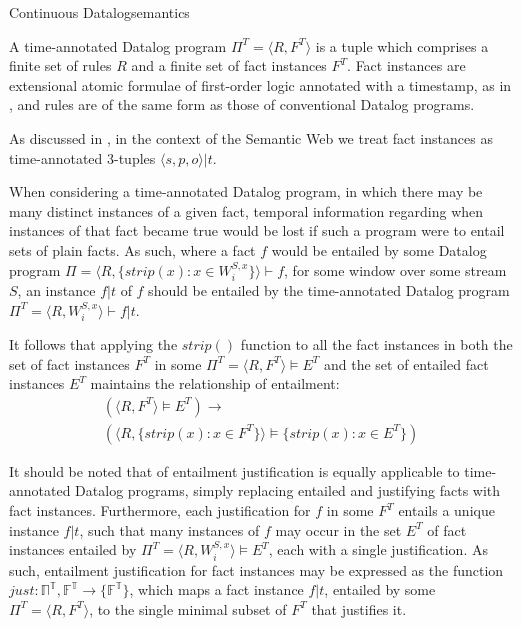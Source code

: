 \begin{nestedsection}{Continuous Datalog}{semantics}
\begin{definition}
A time-annotated Datalog program $\Pi^T = \langle R, F^T\rangle$ is a tuple
which comprises a finite set of rules $R$ and a finite set of fact instances
$F^T$. Fact instances are extensional atomic formulae of first-order logic
annotated with a timestamp, as in ,
and rules are of the same form as those of conventional Datalog programs.

As discussed in ,
in the context of the Semantic Web we treat fact instances as time-annotated
3-tuples ${\langle s, p, o \rangle | t}$.
\end{definition}

When considering a time-annotated Datalog program, in which there may be
many distinct instances of a given fact, temporal information regarding when
instances of that fact became true would be lost if such a program were to entail
sets of plain facts. As such, where a fact $f$ would be entailed by some Datalog
program ${\Pi = \langle R, \{ strip(x) : x \in W^{S,x}_i \} \rangle \vdash f}$,
for some window over some stream $S$, an instance ${f | t}$ of $f$ should be
entailed by the time-annotated Datalog program
${\Pi^T = \langle R, W^{S,x}_i \rangle \vdash f | t}$.

It follows that applying the ${strip()}$ function to all the fact instances in
both the set of fact instances $F^T$ in some ${\Pi^T = \langle R, F^T \rangle \vDash E^T}$
and the set of entailed fact instances $E^T$ maintains the relationship of entailment:
\begin{multline*}
	\left( \langle R, F^T \rangle \vDash E^T \right) \rightarrow \\
		\left( \langle R, \{ strip(x) : x \in F^T \} \rangle \vDash \{ strip(x) : x \in E^T \} \right)
\end{multline*}

It should be noted that  of entailment
justification is equally applicable to time-annotated Datalog programs,
simply replacing entailed and justifying facts with fact instances.
Furthermore, each justification for $f$ in some $F^T$ entails a unique
instance ${f | t}$, such that many instances of $f$ may occur in the set
$E^T$ of fact instances entailed by
${\Pi^T = \langle R, W^{S,x}_i \rangle \vDash E^T}$, each with a single
justification.  As such, entailment justification for fact instances may be
expressed as the function ${just : \mathbb{\Pi^T} , \mathbb{F^T} \rightarrow \{ \mathbb{F^T} \}}$,
which maps a fact instance ${f | t}$, entailed by some
${\Pi^T = \langle R, F^T \rangle}$, to the single minimal subset of $F^T$ that
justifies it.


\end{nestedsection}
